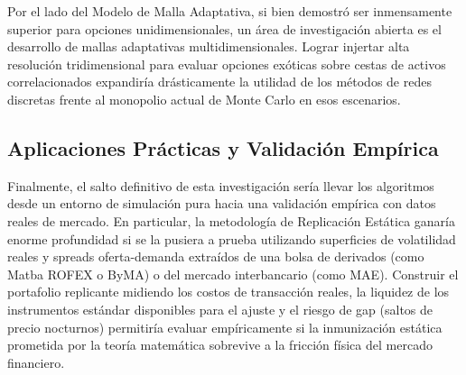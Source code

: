 Por el lado del Modelo de Malla Adaptativa, si bien demostró ser inmensamente superior para opciones unidimensionales, un área de investigación abierta es el desarrollo de mallas adaptativas multidimensionales. Lograr injertar alta resolución tridimensional para evaluar opciones exóticas sobre cestas de activos correlacionados expandiría drásticamente la utilidad de los métodos de redes discretas frente al monopolio actual de Monte Carlo en esos escenarios.

\subsection{Aplicaciones Prácticas y Validación Empírica}

Finalmente, el salto definitivo de esta investigación sería llevar los algoritmos desde un entorno de simulación pura hacia una validación empírica con datos reales de mercado. En particular, la metodología de Replicación Estática ganaría enorme profundidad si se la pusiera a prueba utilizando superficies de volatilidad reales y spreads oferta-demanda extraídos de una bolsa de derivados (como Matba ROFEX o ByMA) o del mercado interbancario (como MAE). Construir el portafolio replicante midiendo los costos de transacción reales, la liquidez de los instrumentos estándar disponibles para el ajuste y el riesgo de gap (saltos de precio nocturnos) permitiría evaluar empíricamente si la inmunización estática prometida por la teoría matemática sobrevive a la fricción física del mercado financiero.

